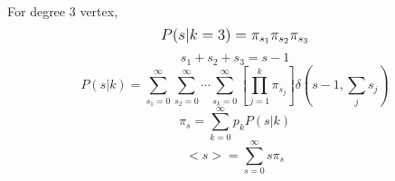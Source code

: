 \documentclass{beamer}
\begin{document}
\begin{frame}
    \frametitle{}
For degree $3$ vertex, 
    $$\mathlarger{P(s|k=3) = \pi_{s_1}\pi_{s_2}\pi_{s_3}}$$
    $$s_1 + s_2 + s_3 = s-1$$
\pause
\justifying
$$P(s|k) = \sum\limits_{s_1=0}^{\infty}\sum\limits_{s_2=0}^{\infty}\cdots\sum\limits_{s_k=0}^{\infty}\left[\prod\limits_{j=1}^k\pi_{s_j}\right]\delta(s-1, \sum\limits_js_j)$$
\pause
$$\pi_s = \sum\limits_{k=0}^{\infty}p_kP(s|k)$$
$$<s> = \sum\limits_{s=0}^\infty s\pi_s$$
\end{frame}
\begin{frame}
    \frametitle{}
    \centering
\end{frame}
\end{document}
